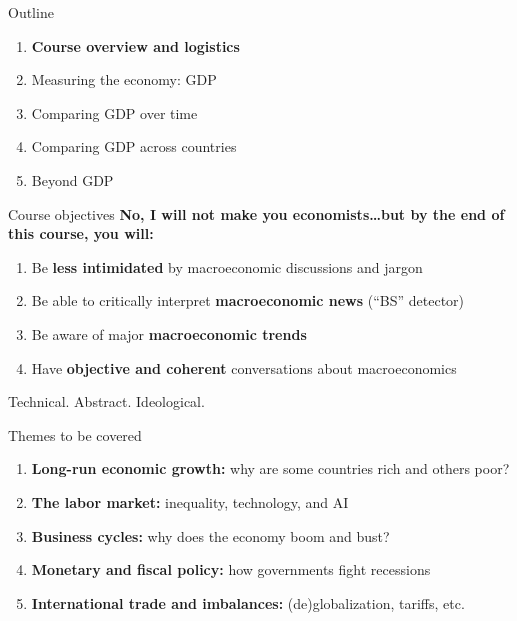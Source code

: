 \documentclass[aspectratio=169]{beamer}
\begin{document}
\begin{frame}{Outline}
   \begin{enumerate}
      \setlength\itemsep{0.35cm}
      \item \textbf{Course overview and logistics}
      \item Measuring the economy: GDP
      \item Comparing GDP over time
      \item Comparing GDP across countries
      \item Beyond GDP
   \end{enumerate}
\end{frame}


\begin{frame}{Course objectives}
   \textbf{No, I will not make you economists\ldots but by the end of this course, you will:}
   \vspace{0.3cm}
   \begin{enumerate}
      \setlength\itemsep{0.3cm}
      \item Be \textbf{less intimidated} by macroeconomic discussions and jargon
      \item Be able to critically interpret \textbf{macroeconomic news} (``BS'' detector)
      \item Be aware of major \textbf{macroeconomic trends}
      \item Have \textbf{objective and coherent} conversations about macroeconomics
   \end{enumerate}
   \vspace{0.5cm}
   \begin{defbox}
      Technical. Abstract. Ideological.
   \end{defbox}
\end{frame}

\begin{frame}{Themes to be covered}
   \begin{enumerate}
      \setlength\itemsep{0.5cm}
      \item \textbf{Long-run economic growth:} why are some countries rich and others poor?
      \item \textbf{The labor market:} inequality, technology, and AI
      \item \textbf{Business cycles:} why does the economy boom and bust?
      \item \textbf{Monetary and fiscal policy:} how governments fight recessions
      \item \textbf{International trade and imbalances:} (de)globalization, tariffs, etc.
   \end{enumerate}
\end{frame}
\end{document}

